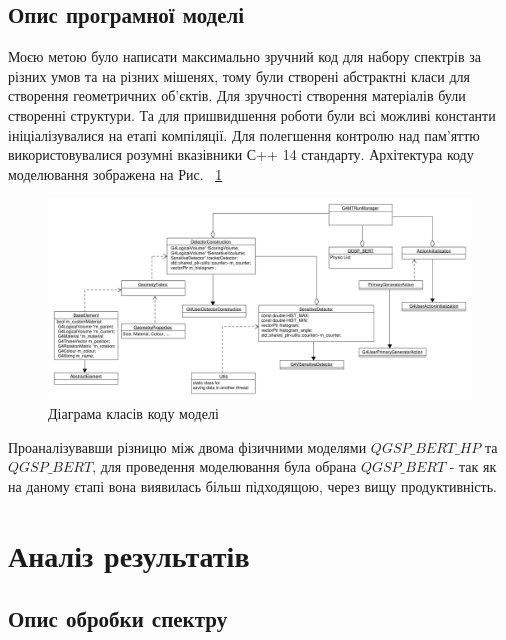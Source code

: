 \documentclass[a4paper, 14pt]{article}
\numberwithin{equation}{section}
\numberwithin{table}{section}
\begin{document}
\subsection{Опис програмної моделі}
Моєю метою було написати максимально зручний код для набору спектрів за різних умов та на різних мішенях, тому були створені абстрактні класи для створення геометричних об'єктів. Для зручності створення матеріалів були створенні структури. 
Та для пришвидшення роботи були всі можливі константи ініціалізувалися на етапі компіляції. Для полегшення контролю над пам'яттю використовувалися розумні вказівники С++ 14 стандарту. Архітектура коду моделювання зображена на Рис. ~\ref{ris:s_classDiagram} 
\begin{figure}[hbt!]
	\centering \includegraphics[width=1\textwidth]{res/classDiagram.pdf}
	\caption{Діаграма класів коду моделі} 
	\label{ris:s_classDiagram}	
\end{figure} 
Проаналізувавши різницю між двома фізичними моделями $QGSP\_BERT\_HP$ та $QGSP\_BERT$, для проведення моделювання була обрана $QGSP\_BERT$ - так як на даному єтапі вона виявилась більш підходящою, через вищу продуктивність.
\newpage 
\section{Аналіз результатів}
\setcounter{figure}{0}
\subsection{Опис обробки спектру}
\end{document}

